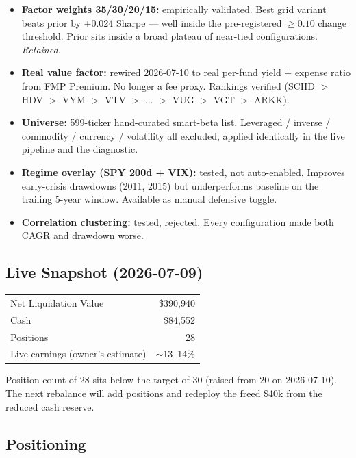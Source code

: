 \documentclass[11pt,a4paper]{article}
\begin{document}
\begin{itemize}[noitemsep]
    \item \textbf{Factor weights 35/30/20/15:} empirically validated. Best grid variant beats prior by +0.024 Sharpe --- well inside the pre-registered $\geq 0.10$ change threshold. Prior sits inside a broad plateau of near-tied configurations. \emph{Retained.}
    \item \textbf{Real value factor:} rewired 2026-07-10 to real per-fund yield + expense ratio from FMP Premium. No longer a fee proxy. Rankings verified (SCHD $>$ HDV $>$ VYM $>$ VTV $>$ $\ldots$ $>$ VUG $>$ VGT $>$ ARKK).
    \item \textbf{Universe:} 599-ticker hand-curated smart-beta list. Leveraged / inverse / commodity / currency / volatility all excluded, applied identically in the live pipeline and the diagnostic.
    \item \textbf{Regime overlay (SPY 200d + VIX):} tested, not auto-enabled. Improves early-crisis drawdowns (2011, 2015) but underperforms baseline on the trailing 5-year window. Available as manual defensive toggle.
    \item \textbf{Correlation clustering:} tested, rejected. Every configuration made both CAGR and drawdown worse.
\end{itemize}

\subsection{Live Snapshot (2026-07-09)}

\begin{table}[H]
\centering
\renewcommand{\arraystretch}{1.3}
\begin{tabular}{lr}
\toprule
Net Liquidation Value & \$390{,}940 \\
Cash                  & \$84{,}552 \\
Positions             & 28 \\
Live earnings (owner's estimate) & $\sim$13--14\% \\
\bottomrule
\end{tabular}
\end{table}

Position count of 28 sits below the target of 30 (raised from 20 on 2026-07-10). The next rebalance will add positions and redeploy the freed \$40k from the reduced cash reserve.

\subsection{Positioning}
\end{document}
